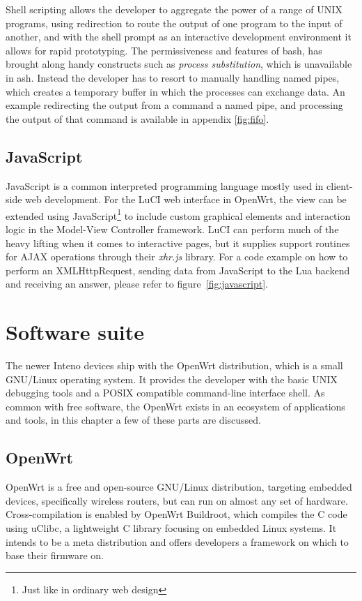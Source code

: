 \documentclass[a4paper,11pt,makeidx]{kth-bcs}
\begin{document}
Shell scripting allows the developer to aggregate the power of a range of UNIX programs, using redirection to route the output of one program to the input of another, and with the shell prompt as an interactive development environment it allows for rapid prototyping.
The permissiveness and features of bash, has brought along handy constructs such as \emph{process substitution}, which is unavailable in ash.
Instead the developer has to resort to manually handling named pipes, which creates a temporary buffer in which the processes can exchange data.
An example redirecting the output from a command a named pipe, and processing the output of that command is available in appendix \ref{fig:fifo}.

\subsection{JavaScript}
JavaScript is a common interpreted programming language mostly used in client-side web development.
For the LuCI web interface in OpenWrt, the view can be extended using JavaScript\footnote{Just like in ordinary web design} to include custom graphical elements and interaction logic in the Model-View Controller framework.
LuCI can perform much of the heavy lifting when it comes to interactive pages, but it supplies support routines for AJAX operations through their \emph{xhr.js} library.
For a code example on how to perform an XMLHttpRequest, sending data from JavaScript to the Lua backend and receiving an answer, please refer to figure~\ref{fig:javascript}.

\section{Software suite}

The newer Inteno devices ship with the OpenWrt distribution, which is a small GNU/Linux operating system.
It provides the developer with the basic UNIX debugging tools and a POSIX compatible command-line interface shell.
As common with free software, the OpenWrt exists in an ecosystem of applications and tools, in this chapter a few of these parts are discussed.

\subsection{OpenWrt}
OpenWrt is a free and open-source GNU/Linux distribution, targeting embedded devices, specifically wireless routers, but can run on almost any set of hardware.
Cross-compilation is enabled by OpenWrt Buildroot, which compiles the C code using uClibc, a lightweight C library focusing on embedded Linux systems. 
It intends to be a meta distribution and offers developers a framework on which to base their firmware on.
\end{document}
